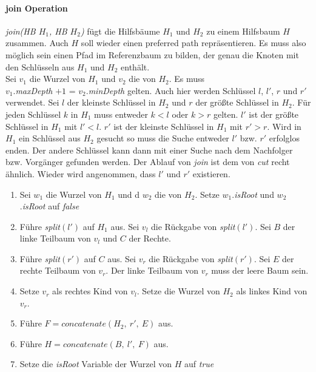 \documentclass[a4paper,12pt]{article}
\begin{document}
\paragraph{join Operation}
\noindent \textit{join(HB $H_1$, HB $H_2$)} fügt die Hilfsbäume $H_1$ und $H_2$ zu einem Hilfsbaum $H$ zusammen. Auch $H$ soll wieder einen preferred path repräsentieren. Es muss also möglich sein einen Pfad im Referenzbaum zu bilden, der genau die Knoten mit den Schlüsseln aus $H_1$ und $H_2$ enthält.\\ 
Sei $v_1$ die Wurzel von $H_1$ und $v_2$ die von $H_2$. Es muss \\ $v_1$.\textit{maxDepth} $+ 1$ =  $v_2$.\textit{minDepth} gelten. Auch hier werden Schlüssel $l$, $l'$, $r$ und $r'$ verwendet. Sei $l$ der kleinste Schlüssel in $H_2$ und $r$ der größte Schlüssel in $H_2$. 
Für jeden Schlüssel $k$ in $H_1$ muss entweder $k < l$ oder $k > r$ gelten. $l'$ ist der größte Schlüssel in $H_1$ mit $l' < l$. $r'$ ist der kleinste Schlüssel in $H_1$ mit $r' > r$. Wird in $H_1$ ein Schlüssel aus $H_2$ gesucht so muss die Suche entweder $l'$ bzw. $r'$ erfolglos enden. Der andere Schlüssel kann dann mit einer Suche nach dem Nachfolger bzw. Vorgänger gefunden werden. Der Ablauf von \textit{join} ist dem von \textit{cut} recht ähnlich. Wieder wird angenommen, dass $l'$ und $r'$ existieren.
\begin{enumerate}
	\item Sei $w_1$ die Wurzel von $H_1$ und d $w_2$ die von $H_2$. Setze $w_1$.\textit{isRoot} und  $w_2$.\textit{isRoot} auf \textit{false} 
	\item Führe \textit{split}$\left(l'\right)$ auf $H_1$ aus. Sei $v_l$ die Rückgabe von \textit{split}$\left(l'\right)$. Sei $B$ der linke Teilbaum von $v_l$ und $C$ der Rechte. 
	\item Führe \textit{split}$\left(r'\right)$ auf $C$ aus. Sei $v_r$ die Rückgabe von \textit{split}$\left(r'\right)$. Sei $E$ der rechte Teilbaum von $v_r$. Der linke Teilbaum von $v_r$ muss der leere Baum sein. 
	\item Setze $v_r$ als rechtes Kind von $v_l$. Setze die Wurzel von $H_2$ als linkes Kind von $v_r$.
	\item Führe $F = \textit{concatenate}\left(H_2, ~ r', ~ E \right)$ aus.
	\item Führe $H = \textit{concatenate}\left(B, ~ l',~ F \right)$ aus.
	\item Setze die \textit{isRoot} Variable der Wurzel von $H$ auf \textit{true} 
\end{enumerate}
\end{document}
